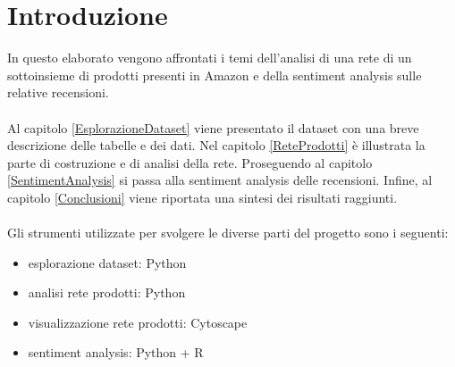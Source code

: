 \section{Introduzione}
In questo elaborato vengono affrontati i temi dell'analisi di una rete di un sottoinsieme di prodotti presenti in Amazon e della sentiment analysis sulle relative recensioni.
\\\\
Al capitolo \ref{EsplorazioneDataset} viene presentato il dataset con una breve descrizione delle tabelle e dei dati. Nel capitolo \ref{ReteProdotti} è illustrata la parte di costruzione e di analisi della rete. Proseguendo al capitolo \ref{SentimentAnalysis} si passa alla sentiment analysis delle recensioni. Infine, al capitolo \ref{Conclusioni} viene riportata una sintesi dei risultati raggiunti.
\\\\
Gli strumenti utilizzate per svolgere le diverse parti del progetto sono i seguenti:
\begin{itemize}
    \item esplorazione dataset: Python
    \item analisi rete prodotti: Python
    \item visualizzazione rete prodotti: Cytoscape
    \item sentiment analysis: Python + R
\end{itemize}
